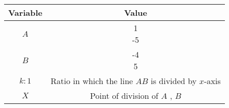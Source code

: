 \begin{tabular}{|c| c |}
\hline
\textbf{Variable} & \textbf{Value} \\
\hline
$A$ & \myvec{1 \\ -5\\}\\
\hline
$B$ & \myvec{-4 \\ 5\\}\\
\hline
$k:1$    & Ratio in which the line $AB$ is divided by $x$-axis \\
\hline
$X$  & Point of division of $A$ , $B$\\
\hline
\end{tabular} 